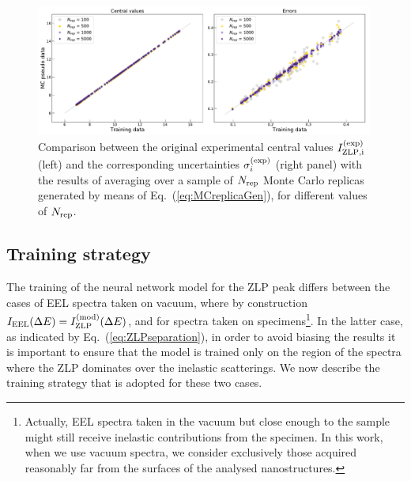 \begin{figure}[t]
    \centering
    \includegraphics[width=0.99\textwidth]{plots/MC.pdf}
    \caption{Comparison between the original experimental central values
      $I_{\rm ZLP,i}^{\rm (exp)}$ (left) and the corresponding 
      uncertainties $\sigma_i^{(\rm exp)}$ (right panel) with the results of averaging over
      a sample of $N_{\rm rep}$ Monte Carlo replicas generated by means of
      Eq.~(\ref{eq:MCreplicaGen}), for different values of
      $N_{\rm rep}$.
      }
    \label{fig:MC}
\end{figure}

\subsection{Training strategy}
\label{sec:training}

The training of the neural network model for the ZLP peak differs between
the cases of EEL spectra taken on vacuum, where by construction $I_{\rm EEL}(\Delta E) =I_{\rm ZLP}^{\rm (mod)}(\Delta E)$,
and for spectra taken on specimens\footnote{Actually, EEL spectra taken in the vacuum but close enough
  to the sample might still receive inelastic contributions from the specimen. In this work,
  when we use vacuum spectra, we consider exclusively those acquired reasonably far from the surfaces
of the analysed nanostructures.}.
%
In the latter case, as indicated by Eq.~(\ref{eq:ZLPseparation}), in order to avoid
biasing the results it is
important to ensure that the model is trained only on the region of the spectra
where the ZLP dominates over the inelastic scatterings.
%
We now describe the training strategy that is adopted for these two cases.

